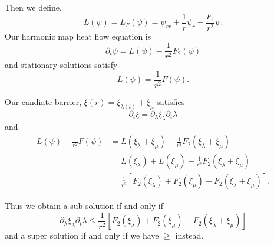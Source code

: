 \documentclass{amsart}
\begin{document}
Then we define,
\[
L(\psi) = L_F(\psi) = \psi_{rr} + \frac{1}{r} \psi_r - \frac{F_1}{r^2} \psi.
\]
Our harmonic map heat flow equation is
\[
\partial_t \psi = L(\psi) - \frac{1}{r^2} F_2(\psi)
\]
and stationary solutions satisfy
\[
L(\psi) = \frac{1}{r^2} F(\psi).
\]

Our candiate barrier, \(\xi(r) = \xi_{\lambda(t)} + \xi_{\mu}\) satisfies
\[
\partial_t \xi = \partial_{\lambda} \xi_{\lambda} \partial_t \lambda
\]
and
\[
\begin{split}
L(\psi) - \frac{1}{r^2} F(\psi) &= L(\xi_{\lambda} + \xi_{\mu}) - \frac{1}{r^2} F_2(\xi_{\lambda} + \xi_{\mu}) \\
&= L(\xi_{\lambda}) + L(\xi_{\mu}) - \frac{1}{r^2} F_2(\xi_{\lambda} + \xi_{\mu}) \\
&= \frac{1}{r^2}\left[F_2(\xi_{\lambda}) + F_2(\xi_{\mu}) - F_2(\xi_{\lambda} + \xi_{\mu})\right].
\end{split}
\]

Thus we obtain a sub solution if and only if
\[
\partial_{\lambda} \xi_{\lambda} \partial_t \lambda \leq \frac{1}{r^2}\left[F_2(\xi_{\lambda}) + F_2(\xi_{\mu}) - F_2(\xi_{\lambda} + \xi_{\mu})\right]
\]
and a super solution if and only if we have \(\geq\) instead.
\end{document}
